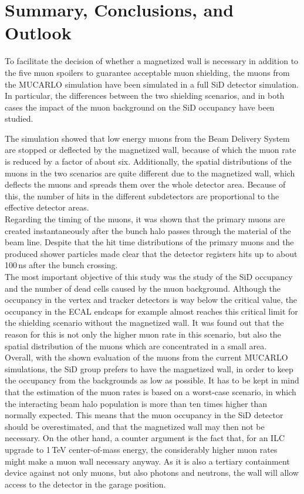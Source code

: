 \section{Summary, Conclusions, and Outlook}

To facilitate the decision of whether a magnetized wall is necessary in addition to the five muon spoilers to guarantee acceptable muon shielding, the muons from the MUCARLO simulation have been simulated in a full SiD detector simulation.
In particular, the differences between the two shielding scenarios, and in both cases the impact of the muon background on the SiD occupancy have been studied.

The simulation showed that low energy muons from the Beam Delivery System are stopped or deflected by the magnetized wall, because of which the muon rate is reduced by a factor of about six.
Additionally, the spatial distributions of the muons in the two scenarios are quite different due to the magnetized wall, which deflects the muons and spreads them over the whole detector area.
Because of this, the number of hits in the different subdetectors are proportional to the effective detector areas.\\
Regarding the timing of the muons, it was shown that the primary muons are created instantaneously after the bunch halo passes through the material of the beam line.
Despite that the hit time distributions of the primary muons and the produced shower particles made clear that the detector registers hits up to about \unit{100}\,{ns} after the bunch crossing.\\
The most important objective of this study was the study of the SiD occupancy and the number of dead cells caused by the muon background.
Although the occupancy in the vertex and tracker detectors is way below the critical value, the occupancy in the ECAL endcaps for example almost reaches this critical limit for the shielding scenario without the magnetized wall.
It was found out that the reason for this is not only the higher muon rate in this scenario, but also the spatial distribution of the muons which are concentrated in a small area.\\
Overall, with the shown evaluation of the muons from the current MUCARLO simulations, the SiD group prefers to have the magnetized wall, in order to keep the occupancy from the backgrounds as low as possible.
It has to be kept in mind that the estimation of the muon rates is based on a worst-case scenario, in which the interacting beam halo population is more than ten times higher than normally expected.
This means that the muon occupancy in the SiD detector should be overestimated, and that the magnetized wall may then not be necessary.
On the other hand, a counter argument is the fact that, for an ILC upgrade to \unit{1}\,{TeV} center-of-mass energy, the considerably higher muon rates might make a muon wall necessary anyway.
As it is also a tertiary containment device against not only muons, but also photons and neutrons, the wall will allow access to the detector in the garage position.

